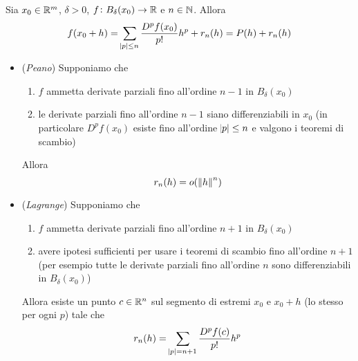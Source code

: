 \begin{thm}[Taylor]
	Sia $ x_0 \in \mathbb{R}^m $, $ \delta > 0 $, $ f \colon B_{\delta}(x_0) \to \mathbb{R} $ e $ n \in \mathbb{N} $. Allora
	\begin{equation}
		f(x_0 + h) = \sum_{\abs{p} \leq n} \frac{D^p{f}(x_0)}{p!}h^p + r_n(h) = P(h) + r_n(h)
	\end{equation}
	\begin{itemize}
		\item (\emph{Peano}) Supponiamo che 
		\begin{enumerate}[label = (\roman*)]
			\item $ f $ ammetta derivate parziali fino all'ordine $ n - 1 $ in $ B_{\delta}(x_0) $
			\item le derivate parziali fino all'ordine $ n - 1 $ siano differenziabili in $ x_0 $ (in particolare $ D^p{f}(x_0) $ esiste fino all'ordine $ \abs{p} \leq n $ e valgono i teoremi di scambio)
		\end{enumerate}
		Allora 
		\begin{equation}
			r_n(h) = o(\,\norm{h}^n)
		\end{equation}
		\item (\emph{Lagrange}) Supponiamo che 
		\begin{enumerate}[label = (\roman*)]
			\item $ f $ ammetta derivate parziali fino all'ordine $ n + 1 $ in $ B_{\delta}(x_0) $
			\item avere ipotesi sufficienti per usare i teoremi di scambio fino all'ordine $ n + 1 $ (per esempio tutte le derivate parziali fino all'ordine $ n $ sono differenziabili in $ B_{\delta}(x_0) $)
		\end{enumerate}
		Allora esiste un punto $ c \in \mathbb{R}^n $ sul segmento di estremi $ x_0 $ e $ x_0 + h $ (lo stesso per ogni $ p $) tale che 
		\begin{equation}
		r_n(h) = \sum_{\abs{p} = n + 1} \frac{D^p{f}(c)}{p!} h^p
		\end{equation}
	\end{itemize}
\end{thm}
%
